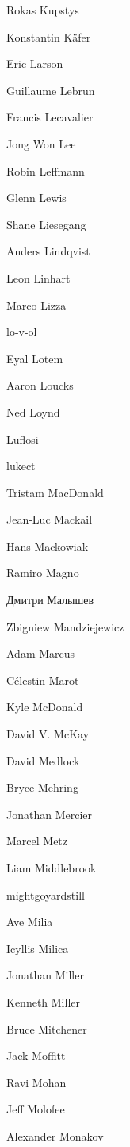 \begin{DoxyItemize}
\item Rokas Kupstys
\item Konstantin Käfer
\item Eric Larson
\item Guillaume Lebrun
\item Francis Lecavalier
\item Jong Won Lee
\item Robin Leffmann
\item Glenn Lewis
\item Shane Liesegang
\item Anders Lindqvist
\item Leon Linhart
\item Marco Lizza
\item lo-\/v-\/ol
\item Eyal Lotem
\item Aaron Loucks
\item Ned Loynd
\item Luflosi
\item lukect
\item Tristam Mac\+Donald
\item Jean-\/\+Luc Mackail
\item Hans Mackowiak
\item Ramiro Magno
\item Дмитри Малышев
\item Zbigniew Mandziejewicz
\item Adam Marcus
\item Célestin Marot
\item Kyle Mc\+Donald
\item David V. Mc\+Kay
\item David Medlock
\item Bryce Mehring
\item Jonathan Mercier
\item Marcel Metz
\item Liam Middlebrook
\item mightgoyardstill
\item Ave Milia
\item Icyllis Milica
\item Jonathan Miller
\item Kenneth Miller
\item Bruce Mitchener
\item Jack Moffitt
\item Ravi Mohan
\item Jeff Molofee
\item Alexander Monakov

\end{DoxyItemize}
